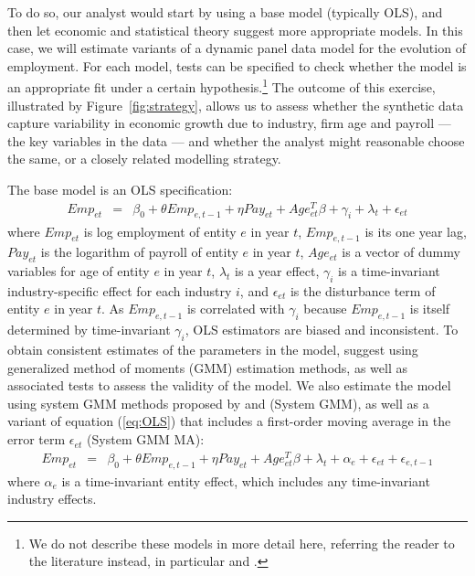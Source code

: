To do so, our analyst would start by using a base model (typically OLS), and then let economic and statistical theory suggest more appropriate models. In this case, we will estimate variants of a dynamic panel data model for the evolution of employment. For each model, tests can be specified to check whether the model is an appropriate fit under a certain hypothesis.\footnote{We do not describe these models in more detail here, referring the reader to the literature instead, in particular \textcite{RePEc:eee:econom:v:68:y:1995:i:1:p:29-51} and \textcite{RePEc:eee:econom:v:87:y:1998:i:1:p:115-143}.} The outcome of this exercise, illustrated by Figure~\ref{fig:strategy}, allows us to assess whether the synthetic data capture variability in economic growth due to industry, firm age and payroll --- the key variables in the data --- and whether the analyst might reasonable choose the same, or a closely related modelling strategy.



The base model is an OLS specification:
\begin{eqnarray}	
\label{eq:OLS}
Emp_{et} & = & \beta_0 + \theta Emp_{e,t-1} + \eta Pay_{et} + Age_{et}^{T}\beta + \gamma_i + \lambda_t + \epsilon_{et}
\end{eqnarray}
where $Emp_{et}$ is log employment of entity $e$ in year $t$, $Emp_{e,t-1}$ is its one year lag, $Pay_{et}$ is the logarithm of payroll of entity $e$ in year $t$, $Age_{et}$ is a vector of dummy variables for age of entity $e$ in year $t$, $\lambda_t$ is a year  effect, $\gamma_i$ is a time-invariant industry-specific effect for each industry $i$, and $\epsilon_{et}$ is the disturbance term of entity $e$ in year $t$. 
As $Emp_{e,t-1}$ is correlated with $\gamma_{i}$ because $Emp_{e,t-1}$ is itself determined by time-invariant $\gamma_{i}$, OLS estimators are biased and inconsistent. To obtain consistent estimates of the parameters in the model, \textcite{RePEc:oup:restud:v:58:y:1991:i:2:p:277-297.} suggest using  generalized method of moments (GMM) estimation methods, as well as associated tests to assess the  validity of the model.  
%
We also estimate the model using system GMM methods proposed by \textcite{RePEc:eee:econom:v:68:y:1995:i:1:p:29-51} and \textcite{RePEc:eee:econom:v:87:y:1998:i:1:p:115-143} (System GMM), as well as a variant of equation (\ref{eq:OLS}) that includes a first-order moving average in the error term $\epsilon_{et}$ (System GMM MA):
\begin{eqnarray}	
Emp_{et}&=&\beta_{0} +\theta Emp_{e,t-1}+\eta Pay_{et} + Age_{et}^{T}\beta + \lambda_t +\alpha_e   + \epsilon_{et} + \epsilon_{e,t-1}
\end{eqnarray}
where $\alpha_e$ is a time-invariant entity effect, which includes any time-invariant industry effects.

